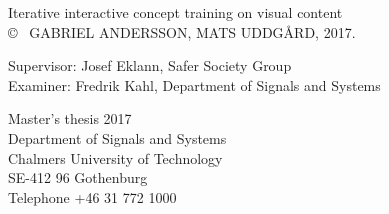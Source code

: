 \newpage
\thispagestyle{plain}
\vspace*{4.5cm}
Iterative interactive concept training on visual content\\

\copyright ~ GABRIEL ANDERSSON, MATS UDDGÅRD, 2017. \setlength{\parskip}{1cm}

Supervisor: Josef Eklann, Safer Society Group\\
Examiner: Fredrik Kahl, Department of Signals and Systems \setlength{\parskip}{1cm}

Master's thesis 2017\\	%
Department of Signals and Systems\\
Chalmers University of Technology\\
SE-412 96 Gothenburg\\
Telephone +46 31 772 1000 \setlength{\parskip}{0.5cm}

\vfill
